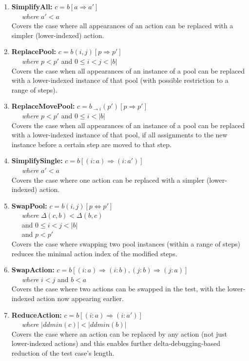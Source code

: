 \begin{enumerate}
\item {\bf SimplifyAll:}
$c = b[a \Rightarrow a']$\\
\-\ \ \ \emph{where} $a' < a$\\
Covers the case where all appearances of an action can be replaced with a 
simpler (lower-indexed) action. 
\item {\bf ReplacePool:}
$c = b(i,j)[p \Rightarrow p']$\\ 
\-\ \ \ \emph{where} $p < p'$ and $0 \leq i < j <
|b|$\\
Covers the case when all appearances of an instance of a pool can be replaced with 
a lower-indexed instance of that pool (with possible restriction to a range of steps).
\item {\bf ReplaceMovePool:}
$c = b_{\rightarrow i}(p')[p \Rightarrow p']$\\
\-\ \ \ \emph{where} $p < p'$ and $0
\leq i < |b|$\\
Covers the case when all appearances of an instance of a pool can be replaced with
a lower-indexed instance of that pool, if all assignments to the new instance before a
certain step are moved to that step.
\item {\bf SimplifySingle:}
$c = b[(i: a) \Rightarrow (i: a')]$\\
\-\ \ \ \emph{where} $a' < a$\\
Covers the case where one action can be replaced with a 
simpler (lower-indexed) action. 
\item {\bf SwapPool:}
$c = b(i,j)[p \Leftrightarrow p']$\\
\-\ \ \ \emph{where} $\Delta(c,b) < \Delta(b,c)$\\
\-\ \ \ and $0 \leq i < j < |b|$\\
\-\ \ \ and $p < p'$\\
Covers the case where swapping two pool instances (within a range of steps) reduces
the minimal action index of the modified steps.
\item {\bf SwapAction:}
$c = b[(i: a) \Rightarrow (i: b), (j: b) \Rightarrow (j: a)]$\\
\-\ \ \ \emph{where} $i < j$ and
$b < a$\\
Covers the case where two actions can be swapped in the test, with the
lower-indexed action now appearing earlier.
\item {\bf ReduceAction:}
$c = b[(i: a) \Rightarrow (i: a')]$\\
\-\ \ \ \emph{where} $|ddmin(c)| < |ddmin(b)|$\\
Covers the case where an action can be replaced by any action (not just lower-indexed
actions) and this enables further delta-debugging-based reduction of
the test case's length.
\end{enumerate}


